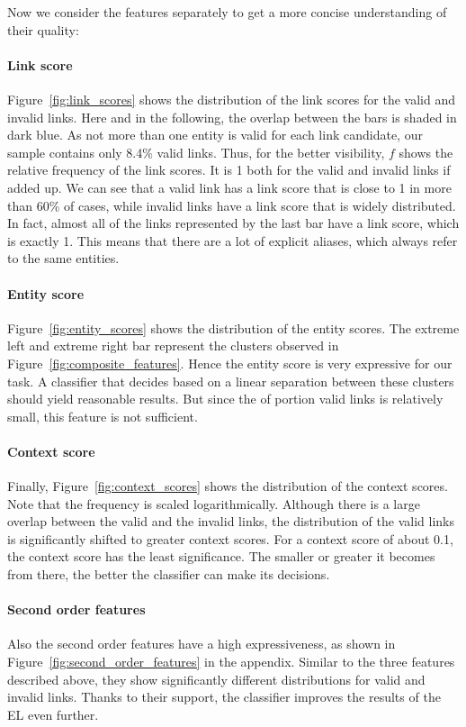 Now we consider the features separately to get a more concise understanding of their quality:

\paragraph{Link score}
Figure~\ref{fig:link_scores} shows the distribution of the link scores for the valid and invalid links. Here and in the following, the overlap between the bars is shaded in dark blue. As not more than one entity is valid for each link candidate, our sample contains only 8.4\% valid links. Thus, for the better visibility, $f$ shows the relative frequency of the link scores. It is 1 both for the valid and invalid links if added up. We can see that a valid link has a link score that is close to 1 in more than 60\% of cases, while invalid links have a link score that is widely distributed. In fact, almost all of the links represented by the last bar have a link score, which is exactly 1. This means that there are a lot of explicit aliases, which always refer to the same entities. 

\paragraph{Entity score}
Figure~\ref{fig:entity_scores} shows the distribution of the entity scores. The extreme left and extreme right bar represent the clusters observed in Figure~\ref{fig:composite_features}. Hence the entity score is very expressive for our task. A classifier that decides based on a linear separation between these clusters should yield reasonable results. But since the of portion valid links is relatively small, this feature is not sufficient.

\paragraph{Context score}
Finally, Figure~\ref{fig:context_scores} shows the distribution of the context scores. Note that the frequency is scaled logarithmically. Although there is a large overlap between the valid and the invalid links, the distribution of the valid links is significantly shifted to greater context scores. For a context score of about 0.1, the context score has the least significance. The smaller or greater it becomes from there, the better the classifier can make its decisions.

\paragraph{Second order features}
Also the second order features have a high expressiveness, as shown in Figure~\ref{fig:second_order_features} in the appendix. Similar to the three features described above, they show significantly different distributions for valid and invalid links. Thanks to their support, the classifier improves the results of the EL even further.


